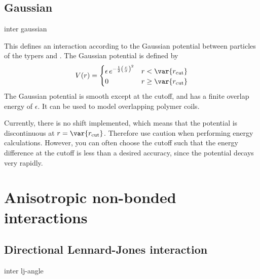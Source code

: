 \subsection{Gaussian}

\begin{essyntax}
  inter  
  gaussian \var{\sigma} \var{\epsilon} 
  \begin{features}
  \end{features}
\end{essyntax}
This defines an interaction according to the Gaussian potential 
between particles of the typers  and .  The
Gaussian potential is defined by
\begin{equation}
  V(r) = 
  \begin{cases} \epsilon\,e^{-\frac{1}{2}\left(\frac{r}{\sigma}\right)^{2}}
    & r < \var{r_\mathrm{cut}}\\
  0 & r \ge \var{r_\mathrm{cut}}
  \end{cases}
\end{equation}
The Gaussian potential is smooth except at the cutoff, and has a
finite overlap energy of $\epsilon$. It can be used to model \eg{}
overlapping polymer coils. 

Currently, there is no shift implemented, which means that the potential 
is discontinuous at $r=\var{r_\mathrm{cut}}$.  Therefore use caution when 
performing energy calculations. However, you can often choose the
cutoff such that the energy difference at the cutoff is less than a
desired accuracy, since the potential decays very
rapidly.

\section{Anisotropic non-bonded interactions}
\label{inter-anisotropic}

\subsection{Directional Lennard-Jones interaction}
\begin{essyntax}
  inter   lj-angle
  \var{\epsilon} \var{\sigma}
    
    
  \begin{features}
  \end{features}
\end{essyntax}

